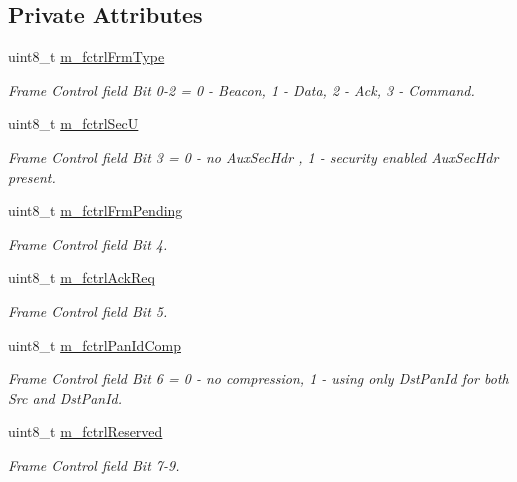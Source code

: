 \subsection*{Private Attributes}
\begin{DoxyCompactItemize}
\item 
uint8\+\_\+t \hyperlink{classns3_1_1LrWpanMacHeader_a75256896400cd8198381a083837a47c8}{m\+\_\+fctrl\+Frm\+Type}
\begin{DoxyCompactList}\small\item\em Frame Control field Bit 0-\/2 = 0 -\/ Beacon, 1 -\/ Data, 2 -\/ Ack, 3 -\/ Command. \end{DoxyCompactList}\item 
uint8\+\_\+t \hyperlink{classns3_1_1LrWpanMacHeader_af43e4ab6a588dc7ce311c8f4be7b8973}{m\+\_\+fctrl\+SecU}
\begin{DoxyCompactList}\small\item\em Frame Control field Bit 3 = 0 -\/ no Aux\+Sec\+Hdr , 1 -\/ security enabled Aux\+Sec\+Hdr present. \end{DoxyCompactList}\item 
uint8\+\_\+t \hyperlink{classns3_1_1LrWpanMacHeader_aa31069c87cc52e0d80e5c3c03c46a75b}{m\+\_\+fctrl\+Frm\+Pending}
\begin{DoxyCompactList}\small\item\em Frame Control field Bit 4. \end{DoxyCompactList}\item 
uint8\+\_\+t \hyperlink{classns3_1_1LrWpanMacHeader_a450be60713dd9f187f80f9bcf4c3b1cc}{m\+\_\+fctrl\+Ack\+Req}
\begin{DoxyCompactList}\small\item\em Frame Control field Bit 5. \end{DoxyCompactList}\item 
uint8\+\_\+t \hyperlink{classns3_1_1LrWpanMacHeader_a46220e38f87383fd1003ae6dbd48b38a}{m\+\_\+fctrl\+Pan\+Id\+Comp}
\begin{DoxyCompactList}\small\item\em Frame Control field Bit 6 = 0 -\/ no compression, 1 -\/ using only Dst\+Pan\+Id for both Src and Dst\+Pan\+Id. \end{DoxyCompactList}\item 
uint8\+\_\+t \hyperlink{classns3_1_1LrWpanMacHeader_a118e2d3b65d95ba32c2214d814153bc0}{m\+\_\+fctrl\+Reserved}
\begin{DoxyCompactList}\small\item\em Frame Control field Bit 7-\/9. \end{DoxyCompactList}\item 

\end{DoxyCompactItemize}
